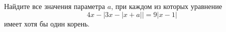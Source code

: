 \begin{ex}
	\begin{condition}
		Найдите все значения параметра \( a \), при каждом из которых уравнение \[ 4x-|3x-|x+a||=9|x-1| \] имеет хотя бы один корень.
	\end{condition}
	\answer{\( [-8;6] \)}
\end{ex}